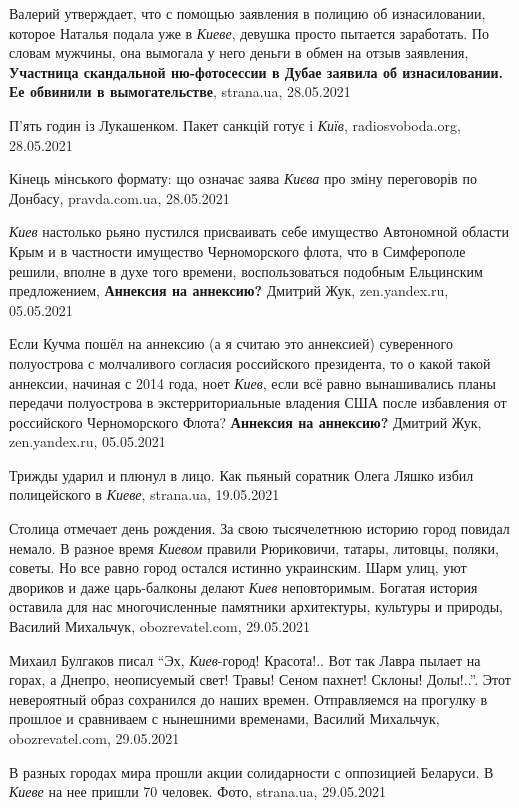 Валерий утверждает, что с помощью заявления в полицию об изнасиловании, которое
Наталья подала уже в \emph{Киеве}, девушка просто пытается заработать. По
словам мужчины, она вымогала у него деньги в обмен на отзыв заявления,
\textbf{Участница скандальной ню-фотосессии в Дубае заявила об изнасиловании.
Ее обвинили в вымогательстве}, strana.ua, 28.05.2021

П'ять годин із Лукашенком. Пакет санкцій готує і \emph{Київ}, radiosvoboda.org, 28.05.2021

Кінець мінського формату: що означає заява \emph{Києва} про зміну переговорів по
Донбасу, pravda.com.ua, 28.05.2021

\emph{Киев} настолько рьяно пустился присваивать себе имущество Автономной
области Крым и в частности имущество Черноморского флота, что в Симферополе
решили, вполне в духе того времени, воспользоваться подобным Ельцинским
предложением, \textbf{Аннексия на аннексию?} Дмитрий Жук, zen.yandex.ru,
05.05.2021

Если Кучма пошёл на аннексию (а я считаю это аннексией) суверенного полуострова
с молчаливого согласия российского президента, то о какой такой аннексии,
начиная с 2014 года, ноет \emph{Киев}, если всё равно вынашивались планы
передачи полуострова в экстерриториальные владения США после избавления от
российского Черноморского Флота? \textbf{Аннексия на аннексию?} Дмитрий Жук,
zen.yandex.ru, 05.05.2021

Трижды ударил и плюнул в лицо. Как пьяный соратник Олега Ляшко избил
полицейского в \emph{Киеве}, strana.ua, 19.05.2021

Столица отмечает день рождения. За свою тысячелетнюю историю город повидал
немало. В разное время \emph{Киевом} правили Рюриковичи, татары, литовцы, поляки,
советы. Но все равно город остался истинно украинским. Шарм улиц, уют
двориков и даже царь-балконы делают \emph{Киев} неповторимым. Богатая история оставила
для нас многочисленные памятники архитектуры, культуры и природы, Василий
Михальчук, obozrevatel.com, 29.05.2021

Михаил Булгаков писал \enquote{Эх, \emph{Киев}-город! Красота!.. Вот так Лавра
пылает на горах, а Днепро, неописуемый свет! Травы! Сеном пахнет! Склоны!
Долы!..}. Этот невероятный образ сохранился до наших времен. Отправляемся на
прогулку в прошлое и сравниваем с нынешними временами, Василий Михальчук,
obozrevatel.com, 29.05.2021

В разных городах мира прошли акции солидарности с оппозицией Беларуси. В \emph{Киеве}
на нее пришли 70 человек. Фото, strana.ua, 29.05.2021

